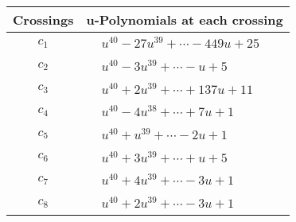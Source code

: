 \documentclass[1p]{elsarticle_modified}
\theoremstyle{definition}
\begin{document}
\begin{tabular}{m{50pt}|m{274pt}}
Crossings & \hspace{64pt}u-Polynomials at each crossing \\
\hline $$\begin{aligned}c_{1}\end{aligned}$$&$\begin{aligned}
&u^{40}-27 u^{39}+\cdots-449 u+25
\end{aligned}$\\
\hline $$\begin{aligned}c_{2}\end{aligned}$$&$\begin{aligned}
&u^{40}-3 u^{39}+\cdots- u+5
\end{aligned}$\\
\hline $$\begin{aligned}c_{3}\end{aligned}$$&$\begin{aligned}
&u^{40}+2 u^{39}+\cdots+137 u+11
\end{aligned}$\\
\hline $$\begin{aligned}c_{4}\end{aligned}$$&$\begin{aligned}
&u^{40}-4 u^{38}+\cdots+7 u+1
\end{aligned}$\\
\hline $$\begin{aligned}c_{5}\end{aligned}$$&$\begin{aligned}
&u^{40}+u^{39}+\cdots-2 u+1
\end{aligned}$\\
\hline $$\begin{aligned}c_{6}\end{aligned}$$&$\begin{aligned}
&u^{40}+3 u^{39}+\cdots+u+5
\end{aligned}$\\
\hline $$\begin{aligned}c_{7}\end{aligned}$$&$\begin{aligned}
&u^{40}+4 u^{39}+\cdots-3 u+1
\end{aligned}$\\
\hline $$\begin{aligned}c_{8}\end{aligned}$$&$\begin{aligned}
&u^{40}+2 u^{39}+\cdots-3 u+1
\end{aligned}$\\

\end{tabular}
\end{document}
